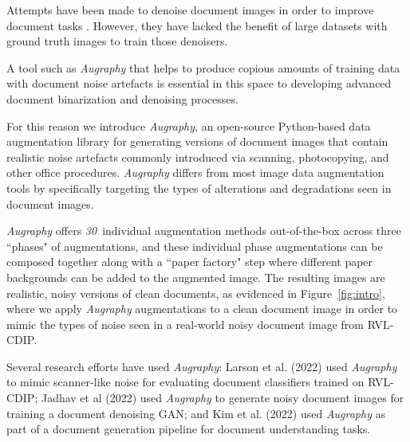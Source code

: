 \documentclass[runningheads]{llncs}
\newcommand{\numAugraphyAugmentations}{\emph{30}}
\begin{document}
Attempts have been made to denoise document images in order to improve document tasks \cite{ref_noisyoffice,blind-denoising-iccv-2021,kulkarni-2020,patch-based-document-denoising,Mustafa_2018-wan}.  However, they have lacked the benefit of large datasets with ground truth images to train those denoisers.

A tool such as \emph{Augraphy} that helps to produce copious amounts of training data with document noise artefacts is essential in this space to developing advanced document binarization and denoising processes.

For this reason we introduce \emph{Augraphy}, an open-source Python-based data augmentation library for generating versions of document images that contain realistic noise artefacts commonly introduced via scanning, photocopying, and other office procedures.
\emph{Augraphy} differs from most image data augmentation tools by specifically targeting the types of alterations and degradations seen in document images.

\emph{Augraphy} offers \numAugraphyAugmentations ~individual augmentation methods out-of-the-box across three ``phases" of augmentations, and these individual phase augmentations can be composed together along with a ``paper factory" step where different paper backgrounds can be added to the augmented image.
The resulting images are realistic, noisy versions of clean documents, as evidenced in Figure~\ref{fig:intro}, where we apply \emph{Augraphy} augmentations to a clean document image in order to mimic the types of noise seen in a real-world noisy document image from RVL-CDIP.

Several research efforts have used \emph{Augraphy}: Larson et al. (2022) \cite{larson-2022-rvlcdip-ood} used \emph{Augraphy} to mimic scanner-like noise for evaluating document classifiers trained on RVL-CDIP; Jadhav et al (2022) \cite{jadhav2022pix2pix} used \emph{Augraphy} to generate noisy document images for training a document denoising GAN; and Kim et al. (2022) \cite{webvicob-2022-naver} used \emph{Augraphy} as part of a document generation pipeline for document understanding tasks.
\end{document}
